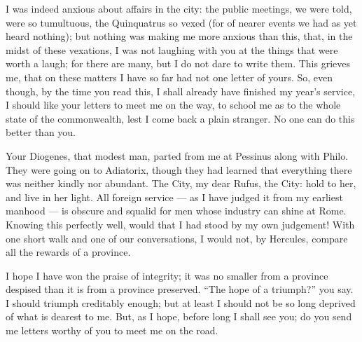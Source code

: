 

 I was indeed anxious about affairs in the city: the public meetings, we were told, were so tumultuous, the Quinquatrus so vexed (for of nearer events we had as yet heard nothing); but nothing was making me more anxious than this, that, in the midst of these vexations, I was not laughing with you at the things that were worth a laugh; for there are many, but I do not dare to write them. This grieves me, that on these matters I have so far had not one letter of yours. So, even though, by the time you read this, I shall already have finished my year's service, I should like your letters to meet me on the way, to school me as to the whole state of the commonwealth, lest I come back a plain stranger. No one can do this better than you.

 Your Diogenes, that modest man, parted from me at Pessinus along with Philo. They were going on to Adiatorix, though they had learned that everything there was neither kindly nor abundant. The City, my dear Rufus, the City: hold to her, and live in her light. All foreign service --- as I have judged it from my earliest manhood --- is obscure and squalid for men whose industry can shine at Rome. Knowing this perfectly well, would that I had stood by my own judgement! With one short walk and one of our conversations, I would not, by Hercules, compare all the rewards of a province.

 I hope I have won the praise of integrity; it was no smaller from a province despised than it is from a province preserved. ``The hope of a triumph?'' you say. I should triumph creditably enough; but at least I should not be so long deprived of what is dearest to me. But, as I hope, before long I shall see you; do you send me letters worthy of you to meet me on the road.
